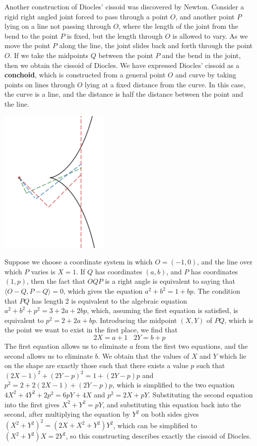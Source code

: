\begin{example}
    Another construction of Diocles' cissoid was discovered by Newton. Consider a rigid right angled joint forced to pass through a point $O$, and another point $P$ lying on a line not passing through $O$, where the length of the joint from the bend to the point $P$ is fixed, but the length through $O$ is allowed to vary. As we move the point $P$ along the line, the joint slides back and forth through the point $O$. If we take the midpoints $Q$ between the point $P$ and the bend in the joint, then we obtain the cissoid of Diocles. We have expressed Diocles' cissoid as a {\bf conchoid}, which is constructed from a general point $O$ and curve by taking points on lines through $O$ lying at a fixed distance from the curve. In this case, the curve is a line, and the distance is half the distance between the point and the line.

    \begin{center}
        \includegraphics[width=0.4\textwidth]{algebraicGeometryConchoidDiocles}
    \end{center}

    Suppose we choose a coordinate system in which $O = (-1,0)$, and the line over which $P$ varies is $X = 1$. If $Q$ has coordinates $(a,b)$, and $P$ has coordinates $(1,p)$, then the fact that $OQP$ is a right angle is equivalent to saying that $\langle O - Q, P - Q \rangle = 0$, which gives the equation $a^2 + b^2 = 1 + bp$. The condition that $PQ$ has length 2 is equivalent to the algebraic equation $a^2 + b^2 + p^2 = 3 + 2a + 2bp$, which, assuming the first equation is satisfied, is equivalent to $p^2 = 2 + 2a + bp$. Introducing the midpoint $(X,Y)$ of $PQ$, which is the point we want to exist in the first place, we find that
    \[ 2X = a + 1\ \ \ \ 2Y = b + p \]
    The first equation allows us to eliminate $a$ from the first two equations, and the second allows us to eliminate $b$. We obtain that the values of $X$ and $Y$ which lie on the shape are exactly those such that there exists a value $p$ such that $(2X - 1)^2 + (2Y - p)^2 = 1 + (2Y - p)p$ and $p^2 = 2 + 2(2X - 1) + (2Y - p)p$, which is simplified to the two equation $4X^2 + 4Y^2 + 2p^2 = 6pY + 4X$ and $p^2 = 2X + pY$. Substituting the second equation into the first gives $X^2 + Y^2 = pY$, and substituting this equation back into the second, after multiplying the equation by $Y^2$ on both sides gives $(X^2 + Y^2)^2 = (2X + X^2 + Y^2)Y^2$, which can be simplified to $(X^2 + Y^2)X = 2Y^2$, so this constructing describes exactly the cissoid of Diocles.


\end{example}
